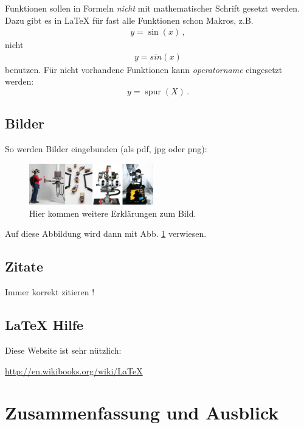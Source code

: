 \documentclass[a4paper]{IEEEtran}
\begin{document}
Funktionen sollen in Formeln \emph{nicht} mit mathematischer Schrift gesetzt werden.
Dazu gibt es in LaTeX für fast alle Funktionen schon Makros, z.B. 
\begin{align}
    y = \sin(x)\,,
\end{align}
nicht 
\begin{align}
    y = sin(x)
\end{align}
benutzen. Für nicht vorhandene Funktionen kann \emph{operatorname} eingesetzt werden:
\begin{equation}
    y = \operatorname{spur}(X) \,.
\end{equation}

\subsection{Bilder}

So werden Bilder eingebunden (als pdf, jpg oder png):

\begin{figure}[!h]
    \centering
    \includegraphics[width=0.48\textwidth]{Bild.png}
    \caption{Hier kommen weitere Erklärungen zum Bild.}
    \label{fig:bild}
\end{figure}

Auf diese Abbildung wird dann mit Abb. \ref{fig:bild} verwiesen.

\subsection{Zitate}

Immer korrekt zitieren \cite{yaakov_bar-shalom_estimation_2001}!

\subsection{LaTeX Hilfe}

Diese Website ist sehr nützlich:

\url{http://en.wikibooks.org/wiki/LaTeX}

\section{Zusammenfassung und Ausblick}
\end{document}
